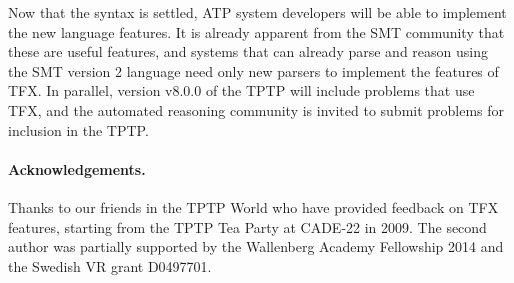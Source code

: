 \documentclass{easychair}
\begin{document}
Now that the syntax is settled, ATP system developers will be able to
implement the new language features.
It is already apparent from the SMT community that these are useful features,
and systems that can already parse and reason using the SMT version 2 language 
need only new parsers to implement the features of TFX.
In parallel, version v8.0.0 of the TPTP will include problems that use TFX,
and the automated reasoning community is invited to submit problems for
inclusion in the TPTP.

\paragraph{Acknowledgements.}
Thanks to our friends in the TPTP World who have provided feedback on TFX
features, starting from the TPTP Tea Party at CADE-22 in 2009. The second
author was partially supported by the Wallenberg Academy Fellowship 2014 and
the Swedish VR grant D0497701.



\end{document}
